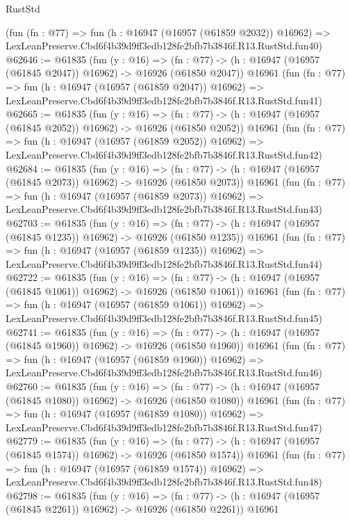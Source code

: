 \begin{lexlean}{RustStd}
\begin{coremodule}
    (fun (fn : @77) =>
    fun (h : @16947 (@16957 (@61859 @2032)) @16962) =>
    LexLeanPreserve.Cbd6f4b39d9ff3edb128fe2bfb7b3846f.R13.RustStd.fun40)
@62646 := @61835
    (fun (y : @16) =>
    (fn : @77) -> (h : @16947 (@16957 (@61845 @2047)) @16962) -> @16926 (@61850 @2047))
    @16961
    (fun (fn : @77) =>
    fun (h : @16947 (@16957 (@61859 @2047)) @16962) =>
    LexLeanPreserve.Cbd6f4b39d9ff3edb128fe2bfb7b3846f.R13.RustStd.fun41)
@62665 := @61835
    (fun (y : @16) =>
    (fn : @77) -> (h : @16947 (@16957 (@61845 @2052)) @16962) -> @16926 (@61850 @2052))
    @16961
    (fun (fn : @77) =>
    fun (h : @16947 (@16957 (@61859 @2052)) @16962) =>
    LexLeanPreserve.Cbd6f4b39d9ff3edb128fe2bfb7b3846f.R13.RustStd.fun42)
@62684 := @61835
    (fun (y : @16) =>
    (fn : @77) -> (h : @16947 (@16957 (@61845 @2073)) @16962) -> @16926 (@61850 @2073))
    @16961
    (fun (fn : @77) =>
    fun (h : @16947 (@16957 (@61859 @2073)) @16962) =>
    LexLeanPreserve.Cbd6f4b39d9ff3edb128fe2bfb7b3846f.R13.RustStd.fun43)
@62703 := @61835
    (fun (y : @16) =>
    (fn : @77) -> (h : @16947 (@16957 (@61845 @1235)) @16962) -> @16926 (@61850 @1235))
    @16961
    (fun (fn : @77) =>
    fun (h : @16947 (@16957 (@61859 @1235)) @16962) =>
    LexLeanPreserve.Cbd6f4b39d9ff3edb128fe2bfb7b3846f.R13.RustStd.fun44)
@62722 := @61835
    (fun (y : @16) =>
    (fn : @77) -> (h : @16947 (@16957 (@61845 @1061)) @16962) -> @16926 (@61850 @1061))
    @16961
    (fun (fn : @77) =>
    fun (h : @16947 (@16957 (@61859 @1061)) @16962) =>
    LexLeanPreserve.Cbd6f4b39d9ff3edb128fe2bfb7b3846f.R13.RustStd.fun45)
@62741 := @61835
    (fun (y : @16) =>
    (fn : @77) -> (h : @16947 (@16957 (@61845 @1960)) @16962) -> @16926 (@61850 @1960))
    @16961
    (fun (fn : @77) =>
    fun (h : @16947 (@16957 (@61859 @1960)) @16962) =>
    LexLeanPreserve.Cbd6f4b39d9ff3edb128fe2bfb7b3846f.R13.RustStd.fun46)
@62760 := @61835
    (fun (y : @16) =>
    (fn : @77) -> (h : @16947 (@16957 (@61845 @1080)) @16962) -> @16926 (@61850 @1080))
    @16961
    (fun (fn : @77) =>
    fun (h : @16947 (@16957 (@61859 @1080)) @16962) =>
    LexLeanPreserve.Cbd6f4b39d9ff3edb128fe2bfb7b3846f.R13.RustStd.fun47)
@62779 := @61835
    (fun (y : @16) =>
    (fn : @77) -> (h : @16947 (@16957 (@61845 @1574)) @16962) -> @16926 (@61850 @1574))
    @16961
    (fun (fn : @77) =>
    fun (h : @16947 (@16957 (@61859 @1574)) @16962) =>
    LexLeanPreserve.Cbd6f4b39d9ff3edb128fe2bfb7b3846f.R13.RustStd.fun48)
@62798 := @61835
    (fun (y : @16) =>
    (fn : @77) -> (h : @16947 (@16957 (@61845 @2261)) @16962) -> @16926 (@61850 @2261))
    @16961

\end{coremodule}
\end{lexlean}
